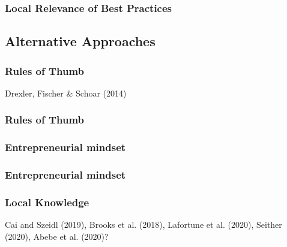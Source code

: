 \documentclass[hideothersubsections, usenames,dvipsnames,10pt]{beamer}
\newenvironment{itemize_3pt}{\itemize\addtolength{\itemsep}{3pt}}{\enditemize}
\begin{document}
\begin{frame}
\frametitle{Local Relevance of Best Practices}
	\begin{itemize_3pt}
	\item 
	\vspace{0.1in}
	\end{itemize_3pt}
\end{frame}


\subsection{Alternative Approaches}

\begin{frame}
\frametitle{Rules of Thumb}
	\begin{itemize_3pt}
	\item Drexler, Fischer \& Schoar (2014) \citep{Drexler2014}
	\vspace{0.1in}
	\end{itemize_3pt}
\end{frame}

\begin{frame}
\frametitle{Rules of Thumb}
	\begin{itemize_3pt}
	\item \citep{Arraiz2019} \citep{Cole2019}
	\vspace{0.1in}
	\end{itemize_3pt}
\end{frame}

%

\begin{frame}
\frametitle{Entrepreneurial mindset}
	\begin{itemize_3pt}
	\item \citep{Campos2017}
	\vspace{0.1in}
	\end{itemize_3pt}
\end{frame}

\begin{frame}
\frametitle{Entrepreneurial mindset}
	\begin{itemize_3pt}
	\item \citep{Alibhai2019} \citep{Ubfal2019}
	\vspace{0.1in}
	\end{itemize_3pt}
\end{frame}


\begin{frame}
\frametitle{Local Knowledge}
	\begin{itemize_3pt}
	\item Cai and Szeidl (2019), Brooks et al. (2018), Lafortune et al. (2020), Seither (2020), Abebe et al. (2020)?
	\vspace{0.1in}
	\end{itemize_3pt}
\end{frame}
\end{document}
